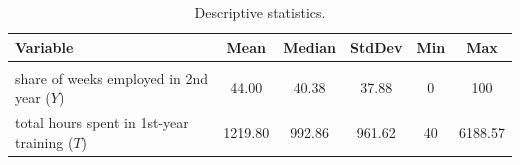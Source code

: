 \documentclass[lettersize, 12pt]{article}
\begin{document}
{       \begin{table}
        \caption{\label{Tss}Descriptive statistics.}
        \begin{center}
         \begin{tabular*}{\textwidth}{@{}lccccc@{}}
                   \hline\hline
Variable  & \multicolumn{1}{c}{Mean} & \multicolumn{1}{c}{Median} & \multicolumn{1}{c}{StdDev} & \multicolumn{1}{c}{Min} & \multicolumn{1}{c}{Max} %
\\ 
\hline \\[-1.8ex] 
  share of weeks employed in 2nd year ($Y$)                     &44.00 &40.38  &37.88 &0 &100  %
  \\
   total hours spent in 1st-year training ($T$)                    &1219.80 &992.86 &961.62  &40  &6188.57 %
   \\

\end{tabular*}
\end{center}
\end{table}}
\end{document}
